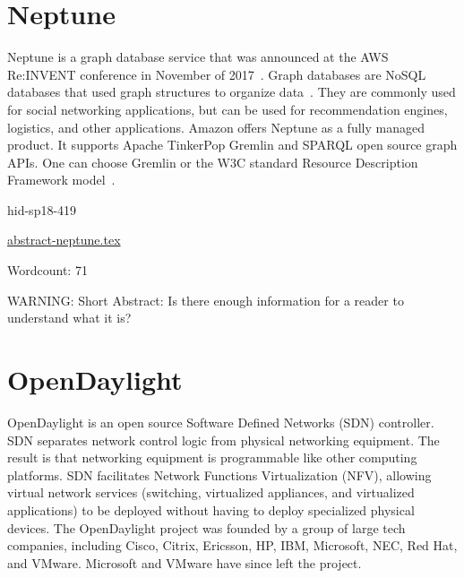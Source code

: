 \section{Neptune}

Neptune is a graph database service that was announced at the AWS
Re:INVENT conference in November of
2017~\cite{hid-sp18-419-www-tc_neptune}. Graph databases are NoSQL
databases that used graph structures to organize
data~\cite{hid-sp18-419-www-tp-graph-db}. They are commonly used for
social networking applications, but can be used for recommendation
engines, logistics, and other applications. Amazon offers Neptune as a
fully managed product. It supports Apache TinkerPop Gremlin and SPARQL
open source graph APIs. One can choose Gremlin or the W3C standard
Resource Description Framework
model~\cite{hid-sp18-419-www-aws-neptune}.


\begin{IU}

hid-sp18-419

\href{https://github.com/cloudmesh-community/hid-sp18-419/blob/master//technology/abstract-neptune.tex}{abstract-neptune.tex}

 

Wordcount: 71

WARNING: Short Abstract: Is there enough information for a reader to understand what it is?

\end{IU}

\section{OpenDaylight}

OpenDaylight is an open source Software Defined Networks (SDN)
controller\cite{hid-sp18-419-www-opendaylight}. SDN separates network
control logic from physical networking equipment. The result is that
networking equipment is programmable like other computing
platforms. SDN facilitates Network Functions Virtualization (NFV),
allowing virtual network services (switching, virtualized appliances,
and virtualized applications) to be deployed without having to deploy
specialized physical devices\cite{hid-sp18-419-www-cio-sdn-nfv}. The
OpenDaylight project was founded by a group of large tech companies,
including Cisco, Citrix, Ericsson, HP, IBM, Microsoft, NEC, Red Hat,
and VMware. Microsoft and VMware have since left the
project\cite{hid-sp18-419-www-sdx-odl}.


